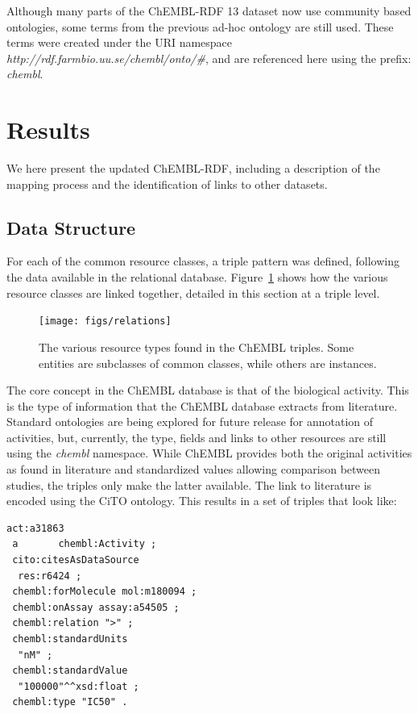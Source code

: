 \documentclass[10pt]{bmc_article}
\newenvironment{bmcformat}{\begin{raggedright}\baselineskip20pt\sloppy\setboolean{publ}{false}}{\end{raggedright}\baselineskip20pt\sloppy}
\begin{document}
\begin{bmcformat}
Although many parts of the ChEMBL-RDF 13 dataset now use community based ontologies, some 
terms from the previous ad-hoc ontology are still used. These terms were created under the 
URI namespace \textit{http://rdf.farmbio.uu.se/chembl/onto/\#}, and are referenced here using the
prefix: \textit{chembl}.


\section*{Results}
\label{s3}

We here present the updated ChEMBL-RDF, including a description of the mapping process 
and the identification of links to other datasets.

\subsection*{Data Structure}

For each of the common resource classes, a triple pattern was defined, following the
data available in the relational database. Figure~\ref{f1} shows how the various resource
classes are linked together, detailed in this section at a triple level.

\begin{figure}[t]
\begin{center}
\texttt{[image: figs/relations]}
\caption{The various resource types found in the ChEMBL triples. Some entities are subclasses
of common classes, while others are instances.}\label{f1}
\end{center}
\end{figure}

The core concept in the ChEMBL database is that of the biological activity. This
is the type of information that the ChEMBL database extracts from literature.
Standard ontologies are being explored for future release for annotation
of activities, but, currently, the
type, fields and links to other resources are still using the \textit{chembl}
namespace. While ChEMBL provides both the original activities as found in literature
and standardized values allowing comparison between studies, the triples only
make the latter available. The link to literature is encoded using the CiTO ontology.
This results in a set of triples that look like:

\begin{small}
\begin{verbatim}
act:a31863
 a       chembl:Activity ;
 cito:citesAsDataSource
  res:r6424 ;
 chembl:forMolecule mol:m180094 ;
 chembl:onAssay assay:a54505 ;
 chembl:relation ">" ;
 chembl:standardUnits
  "nM" ;
 chembl:standardValue
  "100000"^^xsd:float ;
 chembl:type "IC50" .
\end{verbatim}
\end{small}


\end{bmcformat}
\end{document}
